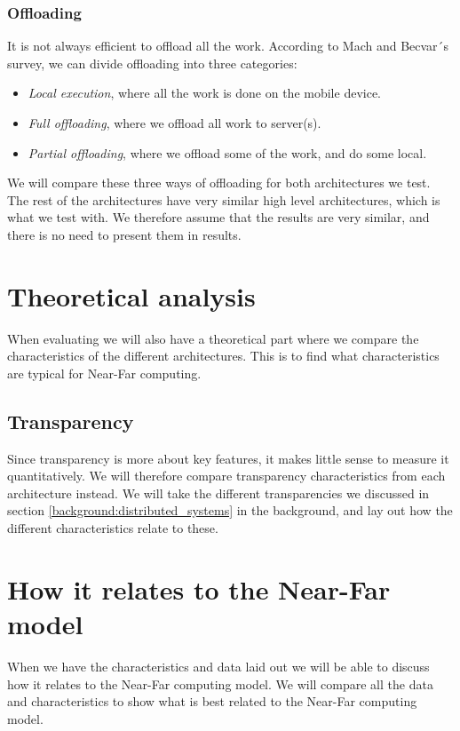 \subsubsection{Offloading}
It is not always efficient to offload all the work. According to Mach and Becvar´s survey\cite{mach_mobile_2017}, we can divide offloading into three categories:
\begin{itemize}
    \item \textit{Local execution}, where all the work is done on the mobile device.
    \item \textit{Full offloading}, where we offload all work to server(s).
    \item \textit{Partial offloading}, where we offload some of the work, and do some local.
\end{itemize}
We will compare these three ways of offloading for both architectures we test.
The rest of the architectures have very similar high level architectures, which is what we test with. We therefore assume that the results are very similar, and there is no need to present them in results.


\section{Theoretical analysis}
When evaluating we will also have a theoretical part where we compare the characteristics of the different architectures. This is to find what characteristics are typical for Near-Far computing.

\subsection{Transparency}
Since transparency is more about key features, it makes little sense to measure it quantitatively. We will therefore compare transparency characteristics from each architecture instead. We will take the different transparencies we discussed in section \ref{background:distributed_systems} in the background, and lay out how the different characteristics relate to these.




\section{How it relates to the Near-Far model}
When we have the characteristics and data laid out we will be able to discuss how it relates to the Near-Far computing model. We will compare all the data and characteristics to show what is best related to the Near-Far computing model.










